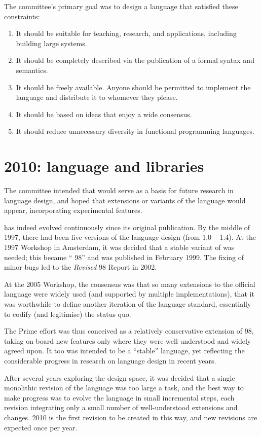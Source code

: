 The committee's primary goal was to design a language that
satisfied these constraints:
\begin{enumerate}
\item It should be suitable for teaching, research, and applications,
      including building large systems.
\item It should be completely described via the publication of a formal
      syntax and semantics.
\item It should be freely available.  Anyone should be permitted to
      implement the language and distribute it to whomever they please.
\item It should be based on ideas that enjoy a wide consensus.  
\item It should reduce unnecessary diversity in functional 
      programming languages.
\end{enumerate}

\section*{\Haskell{} 2010: language and libraries}

The committee intended that \Haskell{} would serve as a basis for
future research in language design, and hoped that extensions or
variants of the language would appear, incorporating experimental
features.

\Haskell{} has indeed evolved continuously since its original publication.
By the middle of 1997, there had been five versions of the language design
(from \Haskell{} 1.0 -- 1.4).  At the 1997 \Haskell{} Workshop 
in Amsterdam, it was decided that a stable variant of \Haskell{} was
needed; this became ``\Haskell{} 98'' and was published in February
1999.  The fixing of minor bugs led to the \emph{Revised} \Haskell{} 98 Report
in 2002.

\begin{haskellprime}
At the 2005 \Haskell{} Workshop, the consensus was that so many extensions
to the official language were widely used (and supported by multiple
implementations), that it was worthwhile to define another iteration of
the language standard, essentially to codify (and legitimise) the status
quo.

The \Haskell{} Prime effort was thus conceived as a relatively
conservative extension of \Haskell{} 98, taking on board new features
only where they were well understood and widely agreed upon.  It too
was intended to be a ``stable'' language, yet reflecting the
considerable progress in research on language design in recent years.

After several years exploring the design space, it was decided that a
single monolithic revision of the language was too large a task, and
the best way to make progress was to evolve the language in small
incremental steps, each revision integrating only a small number of
well-understood extensions and changes.  \Haskell{} 2010 is the first
revision to be created in this way, and new revisions are expected
once per year.
\end{haskellprime}

